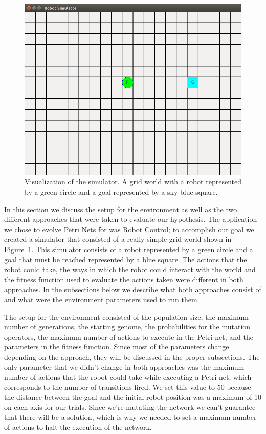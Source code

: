 \documentclass[12pt,a4paper,twocolumn]{article}
\begin{document}
\begin{figure} [b]
\centering
\includegraphics[scale = 0.4, trim = 100mm 90mm 20mm 70mm, clip = true]{robot_sim.png}
\caption{Visualization of the simulator. A grid world with a robot represented by a green circle and a goal represented by a sky blue square.}
\label{fig:grid}
\end{figure}


In this section we discuss the setup for the environment as well as the two different approaches that were taken to evaluate our hypothesis. The application we chose to evolve Petri Nets for was Robot Control; to accomplish our goal we created a simulator that consisted of a really simple grid world shown in Figure~\ref{fig:grid}. This simulator consists of a robot represented by a green circle and a goal that must be reached represented by a blue square. The actions that the robot could take, the ways in which the robot could interact with the world and the fitness function used to evaluate the actions taken were different in both approaches. In the subsections below we describe what both approaches consist of and what were the environment parameters used to run them.

The setup for the environment consisted of the population size, the maximum number of generations, the starting genome, the probabilities for the mutation operators, the maximum number of actions to execute in the Petri net, and the parameters in the fitness function. Since most of the parameters change depending on the approach, they will be discussed in the proper subsections. The only parameter that we didn't change in both approaches was the maximum number of actions that the robot could take while executing a Petri net, which corresponds to the number of transitions fired. We set this value to 50 because the distance between the goal and the initial robot position was a maximum of 10 on each axis for our trials. Since we're mutating the network we can't guarantee that there will be a solution, which is why we needed to set a maximum number of actions to halt the execution of the network.
\end{document}

